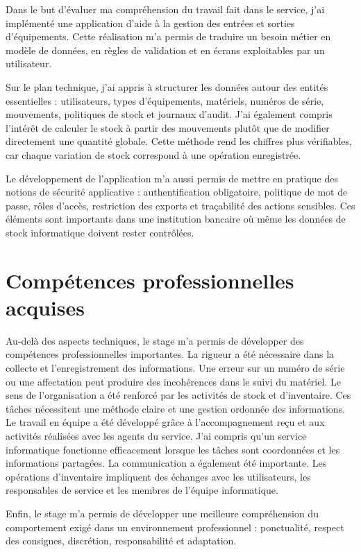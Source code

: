 \documentclass[12pt,a4paper]{report}
\begin{document}
Dans le but d'évaluer ma compréhension du travail fait dans le service, j'ai implémenté une application d'aide à la gestion des entrées et sorties d'équipements. Cette réalisation m'a permis de traduire un besoin métier en modèle de données, en règles de validation et en écrans exploitables par un utilisateur.

Sur le plan technique, j'ai appris à structurer les données autour des entités essentielles : utilisateurs, types d'équipements, matériels, numéros de série, mouvements, politiques de stock et journaux d'audit. J'ai également compris l'intérêt de calculer le stock à partir des mouvements plutôt que de modifier directement une quantité globale. Cette méthode rend les chiffres plus vérifiables, car chaque variation de stock correspond à une opération enregistrée.

Le développement de l'application m'a aussi permis de mettre en pratique des notions de sécurité applicative : authentification obligatoire, politique de mot de passe, rôles d'accès, restriction des exports et traçabilité des actions sensibles. Ces éléments sont importants dans une institution bancaire où même les données de stock informatique doivent rester contrôlées.

\section{Compétences professionnelles acquises}

Au-delà des aspects techniques, le stage m'a permis de développer des compétences professionnelles importantes.
La rigueur a été nécessaire dans la collecte et l'enregistrement des informations. Une erreur sur un numéro de série ou une affectation peut produire des incohérences dans le suivi du matériel.
Le sens de l'organisation a été renforcé par les activités de stock et d'inventaire. Ces tâches nécessitent une méthode claire et une gestion ordonnée des informations.
Le travail en équipe a été développé grâce à l'accompagnement reçu et aux activités réalisées avec les agents du service. J'ai compris qu'un service informatique fonctionne efficacement lorsque les tâches sont coordonnées et les informations partagées.
La communication a également été importante. Les opérations d'inventaire impliquent des échanges avec les utilisateurs, les responsables de service et les membres de l'équipe informatique.

Enfin, le stage m'a permis de développer une meilleure compréhension du comportement exigé dans un environnement professionnel : ponctualité, respect des consignes, discrétion, responsabilité et adaptation.
\end{document}
